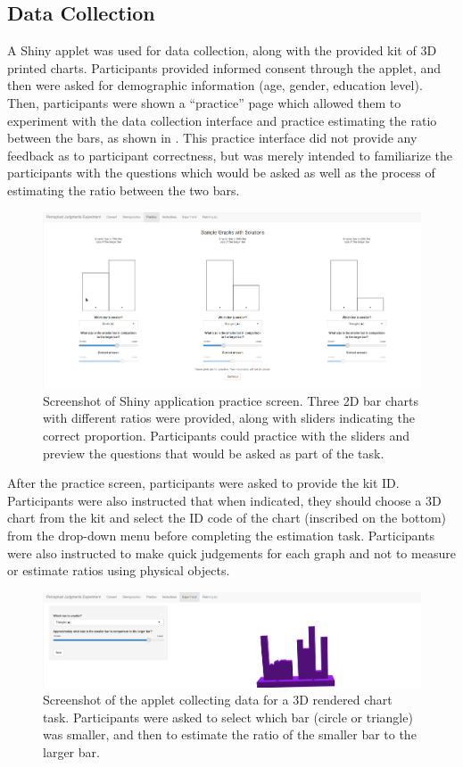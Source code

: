 \documentclass[letterpaper,inpress,dvipsnames]{jdsart}
\begin{document}
\hypertarget{data-collection}{%
\subsection{Data Collection}\label{data-collection}}

A Shiny applet was used for data collection, along with the provided kit of 3D printed charts.
Participants provided informed consent through the applet, and then were asked for demographic information (age, gender, education level).
Then, participants were shown a ``practice'' page which allowed them to experiment with the data collection interface and practice estimating the ratio between the bars, as shown in . This practice interface did not provide any feedback as to participant correctness, but was merely intended to familiarize the participants with the questions which would be asked as well as the process of estimating the ratio between the two bars.

\begin{figure}
\includegraphics[width=0.8\linewidth]{_images/03-Practice-2} \caption{Screenshot of Shiny application practice screen. Three 2D bar charts with different ratios were provided, along with sliders indicating the correct proportion. Participants could practice with the sliders and preview the questions that would be asked as part of the task.}\label{fig:practice}
\end{figure}

After the practice screen, participants were asked to provide the kit ID. Participants were also instructed that when indicated, they should choose a 3D chart from the kit and select the ID code of the chart (inscribed on the bottom) from the drop-down menu before completing the estimation task.
Participants were also instructed to make quick judgements for each graph and not to measure or estimate ratios using physical objects.

\begin{figure}
\includegraphics[width=0.8\linewidth]{_images/05-Experiment-05-filled-in} \caption{Screenshot of the applet collecting data for a 3D rendered chart task. Participants were asked to select which bar (circle or triangle) was smaller, and then to estimate the ratio of the smaller bar to the larger bar.}\label{fig:experiment3dRender}
\end{figure}
\end{document}
